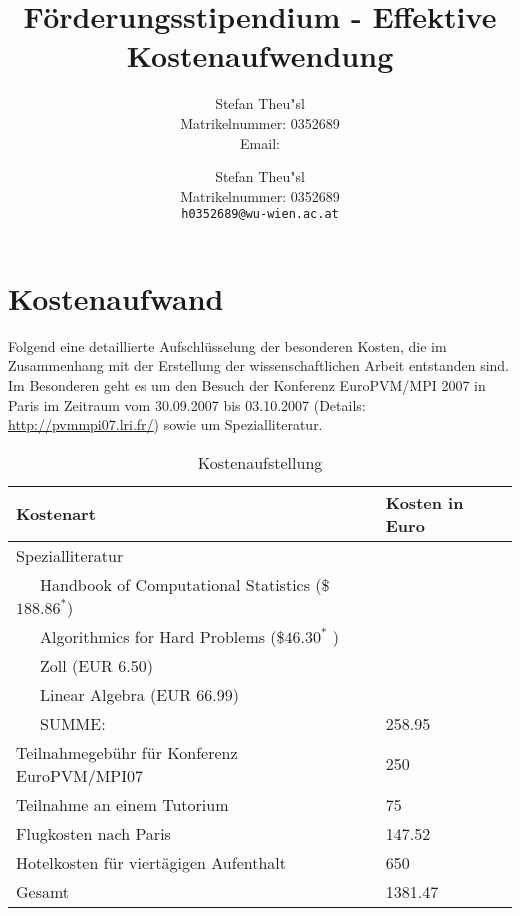 \documentclass[a4paper,fleqn]{article}
\title{F\"orderungsstipendium - Effektive Kostenaufwendung}
\author{Stefan Theu"sl\\Matrikelnummer: 0352689\\Email: \email{h0352689@wu-wien.ac.at}}
\def\email#1{{\tt#1}}
\begin{document}
\author{Stefan Theu"sl \\Matrikelnummer: 0352689\\ \email{h0352689@wu-wien.ac.at}}


\maketitle

\section{Kostenaufwand}

Folgend eine detaillierte Aufschl\"usselung der besonderen Kosten, die
im Zusammenhang mit der Erstellung der wissenschaftlichen Arbeit
entstanden sind. Im Besonderen geht es um den Besuch der Konferenz
EuroPVM/MPI 2007 in Paris im Zeitraum vom 30.09.2007 bis 03.10.2007
(Details: \url{http://pvmmpi07.lri.fr/}) sowie um Spezialliteratur.

\begin{table}[ht]
  \centering
  \caption{Kostenaufstellung}
  \label{table:Kostenaufstellung}
  \begin{tabular}{|l|l|}
    \hline
    Kostenart                              & Kosten in Euro \\
    \hline
    Spezialliteratur                                    & \\
    ~~~Handbook of Computational Statistics (\$$188.86^*$)  & \\
    ~~~Algorithmics for Hard Problems       (\$$46.30^*$ )   & \\
    ~~~Zoll                                 (EUR 6.50)  & \\
    ~~~Linear Algebra                       (EUR 66.99) & \\
    ~~~SUMME:                                       & 258.95\\ 
    Teilnahmegeb\"uhr f\"ur Konferenz EuroPVM/MPI07 & 250  \\
    Teilnahme an einem Tutorium                     &  75  \\
    Flugkosten nach Paris                           & 147.52  \\
    Hotelkosten f\"ur viert\"agigen Aufenthalt      & 650  \\
    \hline
    Gesamt                                          & 1381.47  \\  
    \hline
  \end{tabular}
\end{table}
\end{document}
